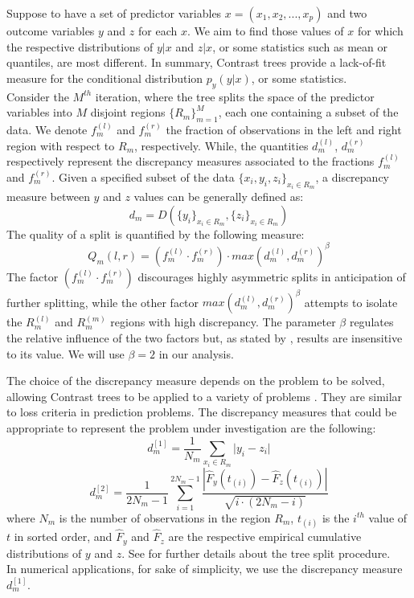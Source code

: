 \documentclass[a4,11pt]{article}
\begin{document}
Suppose to have a set of predictor variables $x = (x_1, x_2,...,x_p)$ and two outcome variables $y$ and $z$ for each $x$. We aim to find those values of $x$ for which the respective distributions of $y | x$ and $z | x$, or some statistics such as mean or quantiles, are most different. In summary, Contrast trees provide a lack-of-fit measure for the conditional distribution $p_y(y | x)$, or some statistics.\\
Consider the $M^{th}$ iteration, where the tree splits the space of the predictor variables into $M$ disjoint regions $\lbrace R_m\rbrace^M_{m=1}$, each one containing a subset of the data. We denote $f_m^{(l)}$ and $f_m^{(r)}$ the fraction of observations in the left and right region with respect to $R_m$, respectively. While, the quantities $d_m^{(l)}$, $d_m^{(r)}$ respectively represent the discrepancy measures associated to the fractions $f_m^{(l)}$ and $f_m^{(r)}$. Given a specified subset of the data $\lbrace x_i,y_i,z_i \rbrace_{x_i\in R_m}$, a discrepancy measure between $y$ and $z$ values can be generally defined as:
\begin{equation}
\label{eq:dm}
d_m=D\left( \lbrace y_i\rbrace_{x_i\in R_m},\lbrace z_i\rbrace_{x_i\in R_m}\right)
\end{equation}
The quality of a split is quantified by the following measure:
\begin{equation}
Q_m(l,r)=\left(f_m^{(l)} \cdot f_m^{(r)}\right) \cdot max\left(d_m^{(l)}, d_m^{(r)} \right)^{\beta}
\end{equation}
The factor $\left(f_m^{(l)} \cdot f_m^{(r)}\right)$ discourages highly asymmetric splits in anticipation of further splitting, while the other factor $max\left(d_m^{(l)}, d_m^{(r)} \right)^{\beta}$ attempts to isolate the $R_m^{(l)}$ and $R_m^{(m)}$ regions with high discrepancy. The parameter $\beta$ regulates the relative influence of the two factors but, as stated by \cite{Friedman2020}, results are insensitive to its value. We will use $\beta=2$ in our analysis.

The choice of the discrepancy measure depends on the problem to be solved, allowing Contrast trees to be applied to a variety of problems \cite{Friedman2020}. They are similar to loss criteria in prediction problems. The discrepancy measures that could be appropriate to represent the problem under investigation are the following:
\begin{equation}
\label{eq:dm1}
d_m^{[1]} = \frac{1}{N_m} \sum_{x_i \in R_m} \lvert y_i-z_i \rvert
\end{equation}
%
\begin{equation}
\label{eq:dm2}
d_m^{[2]} = \frac{1}{2N_m-1} \sum_{i =1}^{2N_m-1} \frac{\left| \hat{F}_y(t_{(i)})-\hat{F}_z(t_{(i)})\right|}{\sqrt{i\cdot(2N_m-i)}}
\end{equation}
where $N_m$ is the number of observations in the region $R_m$,  $t_{(i)}$ is the $i^{th}$ value of $t$ in sorted order, and $\hat{F}_y$ and $\hat{F}_z$ are the respective empirical cumulative distributions of $y$ and $z$. See \cite{Friedman2020} for further details about the tree split procedure.\\
In numerical applications, for sake of simplicity, we use the discrepancy measure $d_m^{[1]}$.
\end{document}
